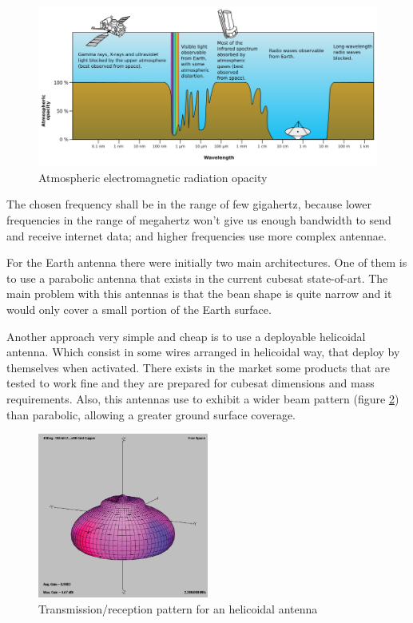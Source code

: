 \begin{figure}[h]
	\centering
	\includegraphics[width=\textwidth]{img/earth_freq.png}
	\caption{Atmospheric electromagnetic radiation opacity}
	\label{fig:frequency_atmosphere_opacity}
\end{figure}

The chosen frequency shall be in the range of few gigahertz, because lower
frequencies in the range of megahertz won't give us enough bandwidth to send and
receive internet data; and higher frequencies use more complex antennae.

For the Earth antenna there were initially two main architectures. One of them
is to use a parabolic antenna that exists in the current cubesat state-of-art.
The main problem with this antennas is that the bean shape is quite narrow and
it would only cover a small portion of the Earth surface.

Another approach very simple and cheap is to use a deployable helicoidal antenna.
Which consist in some wires arranged in helicoidal way, that deploy by themselves
when activated. There exists in the market some products that are tested to work
fine and they are prepared for cubesat dimensions and mass requirements.
Also, this antennas use to exhibit a wider beam pattern (figure \ref{fig:helicoidal_pattern})
than parabolic, allowing a greater ground surface coverage.

\begin{figure}[h]
	\centering
	\includegraphics[width=0.5\textwidth]{img/Earth_antenna_pattern.png}
	\caption{Transmission/reception pattern for an helicoidal antenna}
	\label{fig:helicoidal_pattern}
\end{figure}

